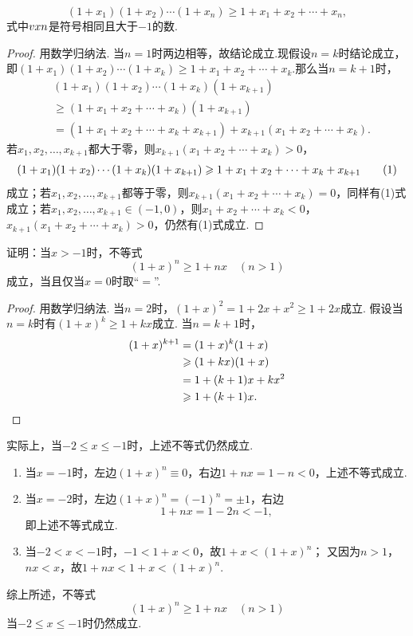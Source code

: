 \begin{theorem}[伯努利不等式]\label{theorem:不等式.伯努利不等式}
\begin{equation}
(1+x_1)(1+x_2)\dotsm(1+x_n) \geqslant 1+x_1+x_2+\dotsb+x_n,
\end{equation}
式中\(v{x}{n}\)是符号相同且大于\(-1\)的数.
\begin{proof}
用数学归纳法.
当\(n=1\)时两边相等，故结论成立.现假设\(n=k\)时结论成立，即\((1+x_1)(1+x_2)\dotsm(1+x_k) \geqslant 1+x_1+x_2+\dotsb+x_k\).那么当\(n=k+1\)时，\begin{align*}
&(1+x_1)(1+x_2)\dotsm(1+x_k)(1+x_{k+1}) \\
&\geqslant (1+x_1+x_2+\dotsb+x_k)(1+x_{k+1}) \\
&= (1+x_1+x_2+\dotsb+x_k+x_{k+1}) + x_{k+1}(x_1+x_2+\dotsb+x_k).
\end{align*}
若\(x_1,x_2,\dotsc,x_{k+1}\)都大于零，则\(x_{k+1}(x_1+x_2+\dotsb+x_k) > 0\)，\begin{gather}
(1+x_1)(1+x_2)\dotsm(1+x_k)(1+x_{k+1}) \geqslant 1+x_1+x_2+\dotsb+x_k+x_{k+1}
\tag1
\end{gather}成立；若\(x_1,x_2,\dotsc,x_{k+1}\)都等于零，则\(x_{k+1}(x_1+x_2+\dotsb+x_k) = 0\)，同样有(1)式成立；若\(x_1,x_2,\dotsc,x_{k+1}\in(-1,0)\)，则\(x_1+x_2+\dotsb+x_k < 0\)，\(x_{k+1}(x_1+x_2+\dotsb+x_k) > 0\)，仍然有(1)式成立.
\end{proof}
\end{theorem}

\begin{example}
证明：当\(x > -1\)时，不等式\begin{equation}
(1+x)^n \geqslant 1+nx \quad (n>1)
\end{equation}成立，当且仅当\(x=0\)时取“\(=\)”.
\begin{proof}
用数学归纳法.
当\(n=2\)时，\((1+x)^2 = 1+2x+x^2 \geqslant 1+2x\)成立.
假设当\(n=k\)时有\((1+x)^k \geqslant 1+kx\)成立.
当\(n=k+1\)时，\begin{align*}
(1+x)^{k+1}
&= (1+x)^k (1+x) \\
&\geqslant (1+kx)(1+x) \\
&= 1 + (k+1)x + kx^2 \\
&\geqslant 1 + (k+1)x.
\qedhere
\end{align*}
\end{proof}
实际上，当\(-2 \leqslant x \leqslant -1\)时，上述不等式仍然成立.

\begin{enumerate}
\item 当\(x = -1\)时，左边\((1+x)^n \equiv 0\)，右边\(1+nx = 1 - n < 0\)，上述不等式成立.

\item 当\(x = -2\)时，左边\((1+x)^n = (-1)^n = \pm1\)，右边\[
1+nx = 1-2n < -1,
\]即上述不等式成立.

\item 当\(-2 < x < -1\)时，\(-1 < 1+x < 0\)，故\(1+x < (1+x)^n\)；
又因为\(n>1\)，\(nx<x\)，故\(1+nx < 1+x < (1+x)^n\).
\end{enumerate}
综上所述，不等式\[
(1+x)^n \geqslant 1+nx \quad (n>1)
\]当\(-2 \leqslant x \leqslant -1\)时仍然成立.
\end{example}

